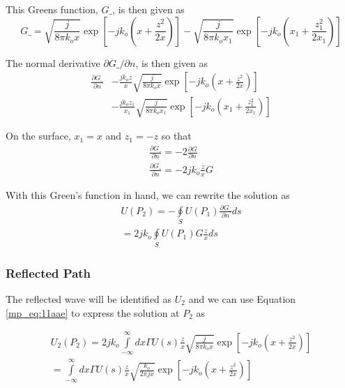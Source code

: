 This Greens function, $G\_$, is then given as
\begin{equation}
G\_= \sqrt{\frac{j}{8\pi k_ox}}\exp\left[-jk_o\left(x + \frac{z^2}{2x}\right) \right] - \sqrt{\frac{j}{8\pi k_ox_1}}\exp\left[-jk_o\left(x_1 + \frac{z_1^2}{2x_1}\right) \right]
\label{mp_eq:11aab}
\end{equation}
\renewcommand{\baselinestretch}{2} \small\normalsize

The normal derivative $\partial G\_/\partial n$, is then given as
\begin{equation}
\begin{aligned}
\frac{\partial G\_}{\partial n}&-\frac{jk_oz}{x}\sqrt{\frac{j}{8\pi k_ox}}\exp\left[-jk_o\left(x + \frac{z^2}{2x}\right) \right] \\
&-\frac{jk_oz_1}{x_1}\sqrt{\frac{j}{8\pi k_ox_1}}\exp\left[-jk_o\left(x_1 + \frac{z_1^2}{2x_1}\right) \right]
\end{aligned}
\label{mp_eq:11aac}
\end{equation}
\renewcommand{\baselinestretch}{2} \small\normalsize

On the surface, $x_1 = x$ and $z_1 = -z$ so that
\begin{equation}
\begin{gathered}
\frac{\partial G\_}{\partial n} = -2\frac{\partial G}{\partial n} \\
\frac{\partial G\_}{\partial n} = -2jk_o\frac{z}{x}G
\end{gathered}
\label{mp_eq:11aad}
\end{equation}
\renewcommand{\baselinestretch}{2} \small\normalsize

With this Green's function in hand, we can rewrite the solution as
\begin{equation}
\begin{gathered}
U(P_2) = -\oint\limits_{S}U(P_1)\frac{\partial G\_}{\partial n}ds\\
= 2jk_o\oint\limits_{S}U(P_1)G\frac{z}{x}ds
\end{gathered}
\label{mp_eq:11aae}
\end{equation}
\renewcommand{\baselinestretch}{2} \small\normalsize

\subsubsection{Reflected Path}
The reflected wave will be identified as $U_2$ and we can use Equation \ref{mp_eq:11aae} to express the solution at $P_2$ as

\begin{equation}
\begin{gathered}
U_2(P_2) = 2jk_o\int\limits_{-\infty}^{\infty}dx\Gamma U(s)\frac{z}{x}\sqrt{\frac{j}{8\pi k_o x}}\exp\left[-jk_o\left(x +\frac{z^2}{2x} \right) \right] \\
= \int\limits_{-\infty}^{\infty}dx\Gamma U(s)\frac{z}{x}\sqrt{\frac{k_o}{2\pi j x}}\exp\left[-jk_o\left(x +\frac{z^2}{2x} \right) \right] \\
\end{gathered}
\label{mp_eq:11aaf}
\end{equation}
\renewcommand{\baselinestretch}{2} \small\normalsize

